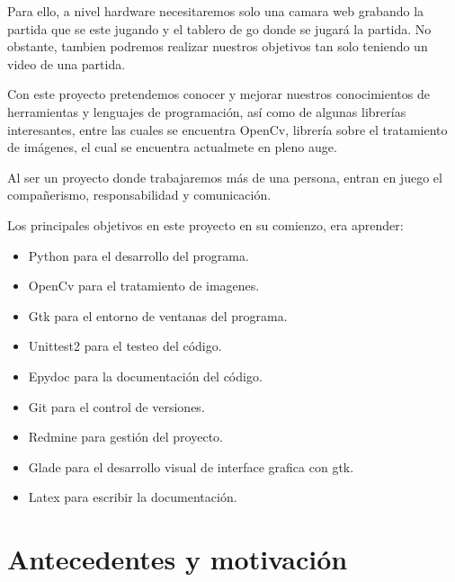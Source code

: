 \documentclass[12pt,a4paper]{report}
\begin{document}
Para ello, a nivel hardware necesitaremos solo una camara web grabando la partida que se este jugando y el tablero de go donde se jugará la partida.
No obstante, tambien podremos realizar nuestros objetivos tan solo teniendo 
un video de una partida.



Con este proyecto pretendemos conocer y mejorar nuestros conocimientos de 
herramientas y lenguajes de programación, así como de algunas librerías
interesantes, entre las cuales se encuentra OpenCv, librería sobre el
tratamiento de imágenes, el cual se encuentra actualmete en pleno auge. 

Al ser un proyecto donde trabajaremos más de una persona, entran en juego el
compañerismo, responsabilidad y comunicación. 

Los principales objetivos en este proyecto en su comienzo, era aprender:
\begin{itemize} 
    \item Python para el desarrollo del programa. 
    \item OpenCv para el tratamiento de imagenes. 
    \item Gtk para el entorno de ventanas del programa. 
    \item Unittest2 para el testeo del código. 
    \item Epydoc para la documentación del código. 
    \item Git para el control de versiones. 
    \item Redmine para gestión del proyecto. 
    \item Glade para el desarrollo visual de interface grafica con gtk.
    \item Latex para escribir la documentación. 
\end{itemize}


\chapter{Antecedentes y motivación}
\end{document}

